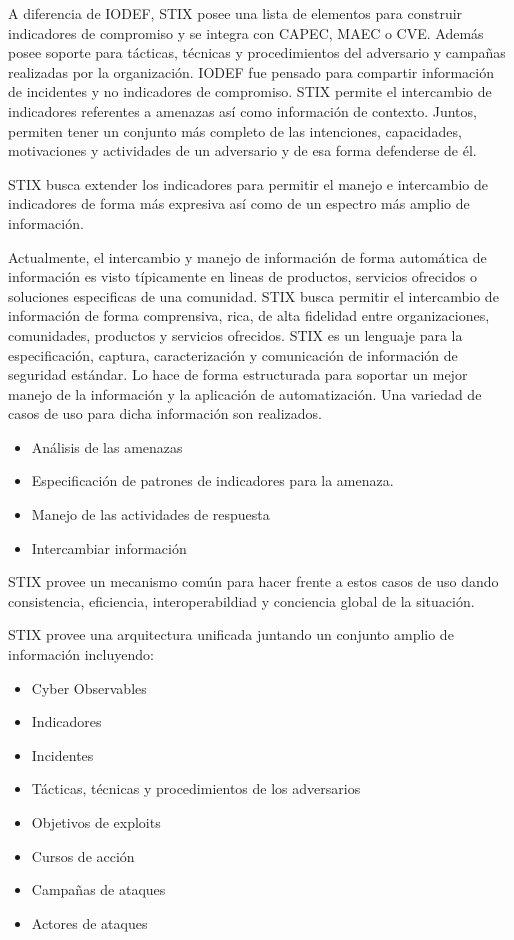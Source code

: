 A diferencia de IODEF, STIX posee una lista de elementos para construir 
indicadores de compromiso y se integra con CAPEC, MAEC o CVE. Además posee 
soporte para tácticas, técnicas y procedimientos del adversario y campañas 
realizadas por la organización. IODEF fue pensado para compartir información de 
incidentes y no indicadores de compromiso. STIX permite el intercambio de 
indicadores referentes a amenazas así como información de contexto. Juntos, 
permiten tener un conjunto más completo de las intenciones, capacidades, 
motivaciones y actividades de un adversario y de esa forma defenderse de él.

STIX busca extender los indicadores para permitir el manejo e intercambio de 
indicadores de forma más expresiva así como de un espectro más amplio de 
información.

Actualmente, el intercambio y manejo de información de forma automática de 
información es visto típicamente en lineas de productos, servicios ofrecidos o 
soluciones especificas de una comunidad. STIX busca permitir el intercambio de 
información de forma comprensiva, rica, de alta fidelidad entre organizaciones, 
comunidades, productos y servicios ofrecidos. STIX es un lenguaje para la 
especificación, captura, caracterización y comunicación de información de 
seguridad estándar. Lo hace de forma estructurada para soportar un mejor manejo 
de la información y la aplicación de automatización. Una variedad de casos de 
uso para dicha información son realizados.
\begin{itemize}
  \item Análisis de las amenazas
  \item Especificación de patrones de indicadores para la amenaza.
  \item Manejo de las actividades de respuesta
  \item Intercambiar información
\end{itemize}

STIX provee un mecanismo común para hacer frente a estos casos de uso dando 
consistencia, eficiencia, interoperabildiad y conciencia global de la situación.

STIX provee una arquitectura unificada juntando un conjunto amplio de 
información incluyendo:
\begin{itemize}
  \item Cyber Observables
  \item Indicadores
  \item Incidentes
  \item Tácticas, técnicas y procedimientos de los adversarios
  \item Objetivos de exploits
  \item Cursos de acción
  \item Campañas de ataques
  \item Actores de ataques
\end{itemize}

